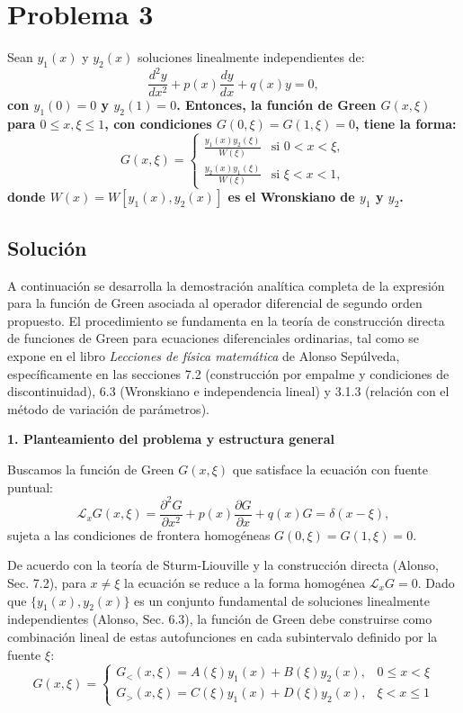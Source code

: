 \documentclass[a4paper]{article}
\begin{document}
\section{Problema 3} 
Sean $y_1(x)$ y $y_2(x)$ soluciones linealmente independientes de:
$$ \frac{d^2y}{dx^2} + p(x) \frac{dy}{dx} + q(x)y = 0, $$
\textbf{con $y_1(0) = 0$ y $y_2(1) = 0$. Entonces, la función de Green $G(x, \xi)$ para $0 \le x, \xi \le 1$, con condiciones $G(0, \xi) = G(1, \xi) = 0$, tiene la forma:}
$$ G(x, \xi) = \begin{cases} \frac{y_1(x)y_2(\xi)}{W(\xi)} & \text{si } 0 < x < \xi, \\ \frac{y_2(x)y_1(\xi)}{W(\xi)} & \text{si } \xi < x < 1, \end{cases} $$
\textbf{donde $W(x) = W[y_1(x), y_2(x)]$ es el Wronskiano de $y_1$ y $y_2$.}


\subsection{Solución}

A continuación se desarrolla la demostración analítica completa de la expresión para la función de Green asociada al operador diferencial de segundo orden propuesto. El procedimiento se fundamenta en la teoría de construcción directa de funciones de Green para ecuaciones diferenciales ordinarias, tal como se expone en el libro \textit{Lecciones de física matemática} de Alonso Sepúlveda, específicamente en las secciones 7.2 (construcción por empalme y condiciones de discontinuidad), 6.3 (Wronskiano e independencia lineal) y 3.1.3 (relación con el método de variación de parámetros).

\textbf{1. Planteamiento del problema y estructura general}

Buscamos la función de Green $G(x, \xi)$ que satisface la ecuación con fuente puntual:
$$ \mathscr{L}_x G(x, \xi) = \frac{\partial^2 G}{\partial x^2} + p(x) \frac{\partial G}{\partial x} + q(x) G = \delta(x - \xi), $$
sujeta a las condiciones de frontera homogéneas $G(0, \xi) = G(1, \xi) = 0$. 

De acuerdo con la teoría de Sturm-Liouville y la construcción directa (Alonso, Sec. 7.2), para $x \neq \xi$ la ecuación se reduce a la forma homogénea $\mathscr{L}_x G = 0$. Dado que $\{y_1(x), y_2(x)\}$ es un conjunto fundamental de soluciones linealmente independientes (Alonso, Sec. 6.3), la función de Green debe construirse como combinación lineal de estas autofunciones en cada subintervalo definido por la fuente $\xi$:
$$ G(x, \xi) = \begin{cases} G_<(x, \xi) = A(\xi) y_1(x) + B(\xi) y_2(x), & 0 \le x < \xi \\ G_>(x, \xi) = C(\xi) y_1(x) + D(\xi) y_2(x), & \xi < x \le 1 \end{cases} $$
\end{document}
